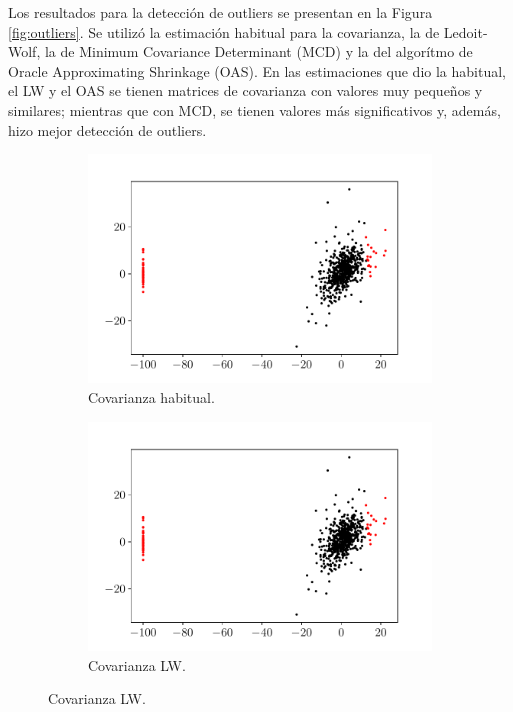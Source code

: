 \documentclass[fleqn]{article}
\begin{document}
Los resultados para la detección de outliers se presentan en la Figura \ref{fig:outliers}. Se utilizó la estimación habitual para la covarianza, la de Ledoit-Wolf, la de Minimum Covariance Determinant (MCD) y la del algorítmo de Oracle Approximating Shrinkage (OAS). En las estimaciones que dio la habitual, el LW y el OAS se tienen matrices de covarianza con valores muy pequeños y similares; mientras que con MCD, se tienen valores más significativos y, además, hizo mejor detección de outliers.

\begin{figure}[H]
    \centering
    \begin{subfigure}[b]{0.45\textwidth}
        \centering
        \includegraphics[width=\textwidth]{src/figs/outliers_habitual.pdf}
        \caption{Covarianza habitual.}
    \end{subfigure}
    \begin{subfigure}[b]{0.45\textwidth}  
        \centering 
        \includegraphics[width=\textwidth]{src/figs/outliers_lw.pdf}
        \caption{Covarianza LW.}
    \end{subfigure}
    

\end{figure}
\end{document}
